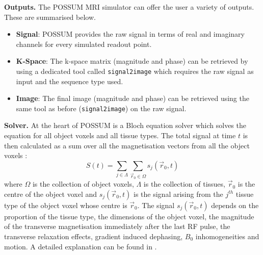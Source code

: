 \hfill

\textbf{Outputs.} The POSSUM MRI simulator can offer the user a variety of outputs.
These are summarised below.
\begin{itemize}
    
    \item \textbf{Signal}: POSSUM provides the raw signal in terms of real and imaginary channels for every simulated readout point.
    
    \item \textbf{K-Space}: The k-space matrix (magnitude and phase) can be retrieved by using a dedicated tool called \texttt{signal2image} which requires the raw signal as input and the sequence type used.
    
    \item \textbf{Image}: The final image (magnitude and phase) can be retrieved using the same tool as before (\texttt{signal2image}) on the raw signal.
    
\end{itemize}

\hfill

\textbf{Solver.} At the heart of POSSUM is a Bloch equation solver which solves the equation for all object voxels and all tissue types.
The total signal at time $t$ is then calculated as a sum over all the magnetisation vectors from all the object voxels \cite{Drobnjak2006}:
\begin{equation}
    S(t) = \sum_{j \in \Lambda} \sum_{\vec{r}_0 \in \Omega} s_j (\vec{r}_0, t)
\end{equation}
where $\Omega$ is the collection of object voxels, $\Lambda$ is the collection of tissues, $\vec{r}_0$ is the centre of the object voxel and $s_j(\vec{r}_0, t)$ is the signal arising from the $j^{th}$ tissue type of the object voxel whose centre is $\vec{r}_0$.
The signal $s_j(\vec{r}_0, t)$ 
depends on the proportion of the tissue type, the dimensions of the object voxel, the magnitude of the transverse magnetisation immediately after the last RF pulse, the transverse relaxation effects, gradient induced dephasing, $B_0$ inhomogeneities and motion.
A detailed explanation can be found in \cite{Drobnjak2006}.


